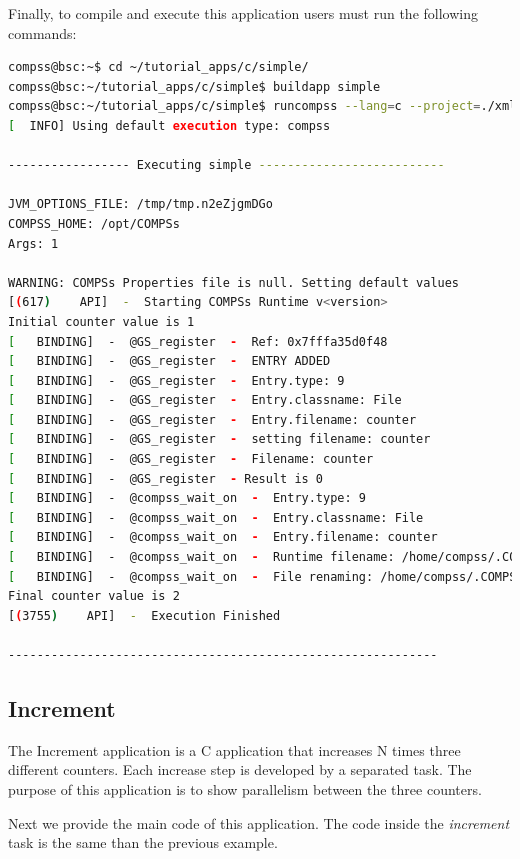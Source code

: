 Finally, to compile and execute this application users must run the following commands:

\begin{lstlisting}[language=bash]
compss@bsc:~$ cd ~/tutorial_apps/c/simple/
compss@bsc:~/tutorial_apps/c/simple$ buildapp simple
compss@bsc:~/tutorial_apps/c/simple$ runcompss --lang=c --project=./xml/project.xml --resources=./xml/resources.xml ~/tutorial_apps/c/simple/master/simple 1
[  INFO] Using default execution type: compss

----------------- Executing simple --------------------------

JVM_OPTIONS_FILE: /tmp/tmp.n2eZjgmDGo
COMPSS_HOME: /opt/COMPSs
Args: 1
 
WARNING: COMPSs Properties file is null. Setting default values
[(617)    API]  -  Starting COMPSs Runtime v<version>
Initial counter value is 1
[   BINDING]  -  @GS_register  -  Ref: 0x7fffa35d0f48
[   BINDING]  -  @GS_register  -  ENTRY ADDED
[   BINDING]  -  @GS_register  -  Entry.type: 9
[   BINDING]  -  @GS_register  -  Entry.classname: File
[   BINDING]  -  @GS_register  -  Entry.filename: counter
[   BINDING]  -  @GS_register  -  setting filename: counter
[   BINDING]  -  @GS_register  -  Filename: counter
[   BINDING]  -  @GS_register  - Result is 0
[   BINDING]  -  @compss_wait_on  -  Entry.type: 9
[   BINDING]  -  @compss_wait_on  -  Entry.classname: File
[   BINDING]  -  @compss_wait_on  -  Entry.filename: counter
[   BINDING]  -  @compss_wait_on  -  Runtime filename: /home/compss/.COMPSs/simple_01/tmpFiles/d1v2_1479141705574.IT
[   BINDING]  -  @compss_wait_on  -  File renaming: /home/compss/.COMPSs/simple_01/tmpFiles/d1v2_1479141705574.IT to counter
Final counter value is 2
[(3755)    API]  -  Execution Finished

------------------------------------------------------------
\end{lstlisting}


\subsection{Increment}
The Increment application is a C application that increases N times three different counters. Each increase step is developed by a separated task. The
purpose of this application is to show parallelism between the three counters.

Next we provide the main code of this application. The code inside the \textit{increment} task is the same than the previous example. 

